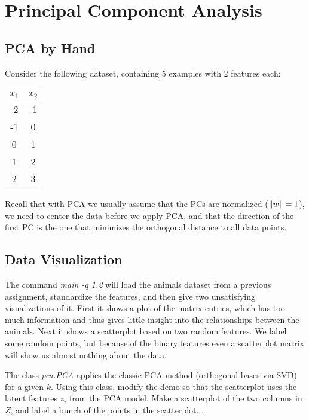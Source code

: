 \documentclass{article}
\begin{document}
\section{Principal Component Analysis}

\subsection{PCA by Hand}


Consider the following dataset, containing 5 examples with 2 features each:
\begin{center}
\begin{tabular}{cc}
$x_1$ & $x_2$\\
\hline
-2 & -1\\
-1 & 0\\
0 & 1\\
1 & 2\\
2 & 3\\
\end{tabular}
\end{center}
Recall that with PCA we usually assume that the PCs are normalized ($\|w\| = 1$), we need to center the data before we apply PCA, and that the direction of the first PC is the one that minimizes the orthogonal distance to all data points.



\subsection{Data Visualization}

The command \emph{main -q 1.2} will load the animals dataset from a previous assignment, standardize the features, and then give two unsatisfying visualizations of it. 
First it shows a plot of the matrix entries, which has too much information and thus gives little insight into the relationships between the animals. 
Next it shows a scatterplot based on two random features. 
We label some random points, but because of the binary features even a scatterplot matrix will show us almost nothing about the data.

The class \emph{pca.PCA} applies the classic PCA method (orthogonal bases via SVD) for a given $k$. 
Using this class, modify the demo so that the scatterplot uses the latent features $z_i$ from the PCA model. 
Make a scatterplot of the two columns in $Z$, and label a bunch of the points in the scatterplot. .
 
\end{document}
